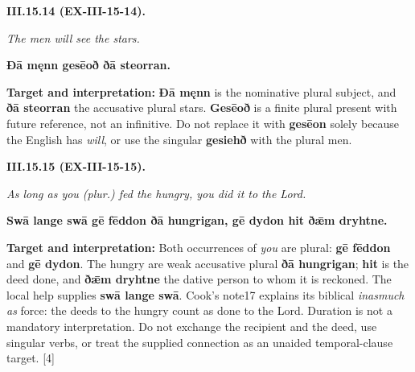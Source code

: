 \par\begin{minipage}{\linewidth}\raggedright
\textbf{III.15.14 (EX-III-15-14).}

\emph{The men will see the stars.}

\textbf{Ðā męnn gesēoð ðā steorran.}

\textbf{Target and interpretation:} \textbf{Ðā męnn} is the nominative plural subject, and \textbf{ðā steorran} the accusative plural stars. \textbf{Gesēoð} is a finite plural present with future reference, not an infinitive. Do not replace it with \textbf{gesēon} solely because the English has \emph{will}, or use the singular \textbf{gesiehð} with the plural men.

\end{minipage}\par\addvspace{4pt}

\par\begin{minipage}{\linewidth}\raggedright
\textbf{III.15.15 (EX-III-15-15).}

\emph{As long as you (plur.) fed the hungry, you did it to the Lord.}

\textbf{Swā lange swā gē fēddon ðā hungrigan, gē dydon hit ðǣm dryhtne.}

\textbf{Target and interpretation:} Both occurrences of \emph{you} are plural: \textbf{gē fēddon} and \textbf{gē dydon}. The hungry are weak accusative plural \textbf{ðā hungrigan}; \textbf{hit} is the deed done, and \textbf{ðǣm dryhtne} the dative person to whom it is reckoned. The local help supplies \textbf{swā lange swā}. Cook's note17 explains its biblical \emph{inasmuch as} force: the deeds to the hungry count as done to the Lord. Duration is not a mandatory interpretation. Do not exchange the recipient and the deed, use singular verbs, or treat the supplied connection as an unaided temporal-clause target. [4]

\end{minipage}\par\addvspace{4pt}

